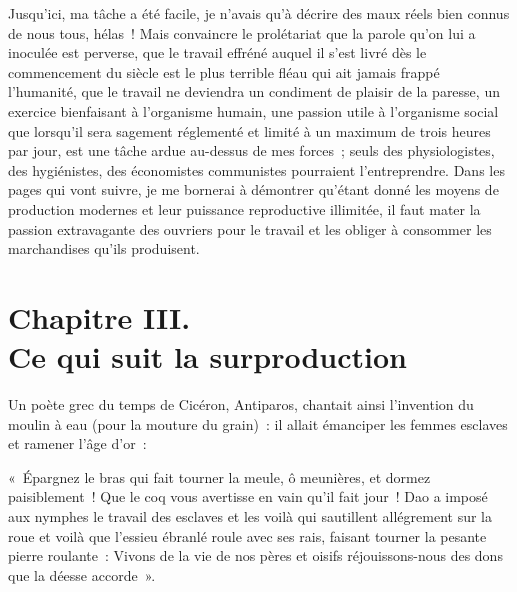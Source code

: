 \documentclass[french,twoside]{book} %
\newenvironment{quoteblock}%
  {\begin{quoting}}
  {\end{quoting}}
\newcommand\chapteropen{} %
\newcommand\chaptercont{} %
\newcommand\chapterclose{} %
\newenvironment{quotebar}{%
    \def\FrameCommand{{\color{rubric!10!}\vrule width 0.5em} \hspace{0.9em}}%
    \def\OuterFrameSep{\itemsep} %
    \MakeFramed {\advance\hsize-\width \FrameRestore}
  }%
  {%
    \endMakeFramed
  }
\renewenvironment{quoteblock}%
  {%
    \savenotes
    \setstretch{0.9}
    \normalfont
    \begin{quotebar}
  }
  {%
    \end{quotebar}
    \spewnotes
  }
\begin{document}
Jusqu’ici, ma tâche a été facile, je n’avais qu’à décrire des maux réels bien connus de nous tous, hélas ! Mais convaincre le prolétariat que la parole qu’on lui a inoculée est perverse, que le travail effréné auquel il s’est livré dès le commencement du siècle est le plus terrible fléau qui ait jamais frappé l’humanité, que le travail ne deviendra un condiment de plaisir de la paresse, un exercice bienfaisant à l’organisme humain, une passion utile à l’organisme social que lorsqu’il sera sagement réglementé et limité à un maximum de trois heures par jour, est une tâche ardue au-dessus de mes forces ; seuls des physiologistes, des hygiénistes, des économistes communistes pourraient l’entreprendre. Dans les pages qui vont suivre, je me bornerai à démontrer qu’étant donné les moyens de production modernes et leur puissance reproductive illimitée, il faut mater la passion extravagante des ouvriers pour le travail et les obliger à consommer les marchandises qu’ils produisent.
\chapterclose


\chapteropen
\chapter[{Chapitre III. Ce qui suit la surproduction}]{Chapitre III. \\
Ce qui suit la surproduction}\renewcommand{\leftmark}{Chapitre III. \\
Ce qui suit la surproduction}


\chaptercont
\noindent Un poète grec du temps de Cicéron, Antiparos, chantait ainsi l’invention du moulin à eau (pour la mouture du grain) : il allait émanciper les femmes esclaves et ramener l’âge d’or :\par

\begin{quoteblock}
 \noindent « Épargnez le bras qui fait tourner la meule, ô meunières, et dormez paisiblement ! Que le coq vous avertisse en vain qu’il fait jour ! Dao a imposé aux nymphes le travail des esclaves et les voilà qui sautillent allégrement sur la roue et voilà que l’essieu ébranlé roule avec ses rais, faisant tourner la pesante pierre roulante : Vivons de la vie de nos pères et oisifs réjouissons-nous des dons que la déesse accorde ».
\end{quoteblock}
\end{document}
